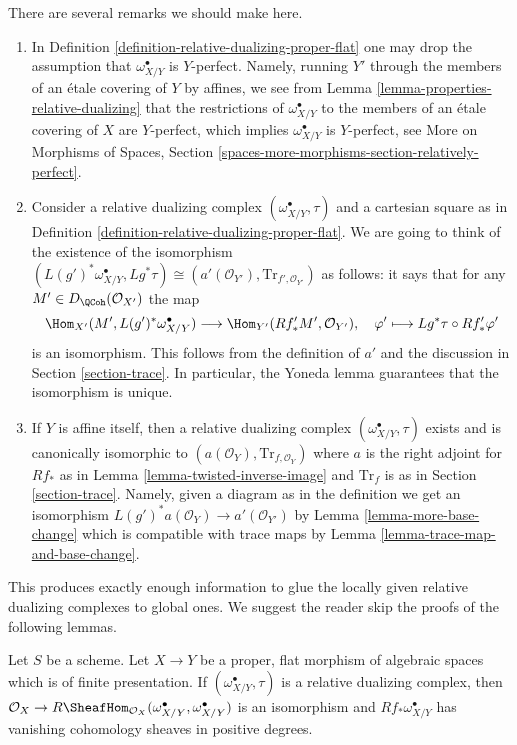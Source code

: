 \noindent
There are several remarks we should make here.
\begin{enumerate}
\item In Definition \ref{definition-relative-dualizing-proper-flat}
one may drop the assumption that $\omega_{X/Y}^\bullet$ is $Y$-perfect.
Namely, running $Y'$ through the members of an \'etale covering of $Y$
by affines, we see from Lemma \ref{lemma-properties-relative-dualizing}
that the restrictions of $\omega_{X/Y}^\bullet$ to the members of
an \'etale covering of $X$ are $Y$-perfect, which implies
$\omega_{X/Y}^\bullet$ is $Y$-perfect, see
More on Morphisms of Spaces, Section
\ref{spaces-more-morphisms-section-relatively-perfect}.
\item Consider a relative dualizing complex
$(\omega_{X/Y}^\bullet, \tau)$ and a cartesian square as in
Definition \ref{definition-relative-dualizing-proper-flat}.
We are going to think of the existence of the isomorphism
$(L(g')^*\omega_{X/Y}^\bullet, Lg^*\tau) \cong
(a'(\mathcal{O}_{Y'}), \text{Tr}_{f', \mathcal{O}_{Y'}})$
as follows: it says that for any $M' \in D_\QCoh(\mathcal{O}_{X'})$
the map
$$
\Hom_{X'}(M', L(g')^*\omega_{X/Y}^\bullet)
\longrightarrow
\Hom_{Y'}(Rf'_*M', \mathcal{O}_{Y'}),\quad
\varphi' \longmapsto Lg^*\tau \circ Rf'_*\varphi'
$$
is an isomorphism. This follows from the definition of $a'$
and the discussion in Section \ref{section-trace}. In particular,
the Yoneda lemma guarantees that the isomorphism is unique.
\item If $Y$ is affine itself, then a relative dualizing complex
$(\omega_{X/Y}^\bullet, \tau)$ exists and is canonically isomorphic
to $(a(\mathcal{O}_Y), \text{Tr}_{f, \mathcal{O}_Y})$ where
$a$ is the right adjoint for $Rf_*$ as in
Lemma \ref{lemma-twisted-inverse-image}
and $\text{Tr}_f$ is as in Section \ref{section-trace}.
Namely, given a diagram as in the definition we get
an isomorphism $L(g')^*a(\mathcal{O}_Y) \to a'(\mathcal{O}_{Y'})$ by
Lemma \ref{lemma-more-base-change}
which is compatible with trace maps by
Lemma \ref{lemma-trace-map-and-base-change}.
\end{enumerate}
This produces exactly enough information to glue the locally given
relative dualizing complexes to global ones. We suggest the reader
skip the proofs of the following lemmas.

\begin{lemma}
\label{lemma-relative-dualizing-RHom}
Let $S$ be a scheme. Let $X \to Y$ be a proper, flat morphism of
algebraic spaces which is of finite presentation.
If $(\omega_{X/Y}^\bullet, \tau)$ is a relative dualizing complex,
then  $\mathcal{O}_X \to
R\SheafHom_{\mathcal{O}_X}(\omega_{X/Y}^\bullet, \omega_{X/Y}^\bullet)$
is an isomorphism and $Rf_*\omega_{X/Y}^\bullet$ has vanishing cohomology
sheaves in positive degrees.
\end{lemma}

